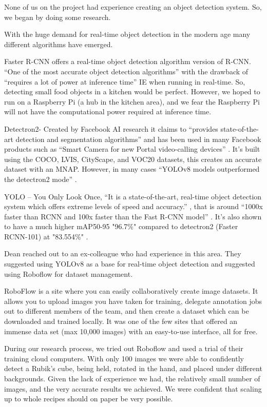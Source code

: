 \documentclass{article}
\begin{document}
None of us on the project had experience creating an object detection system. So, we began by doing some research.

With the huge demand for real-time object detection in the modern age many different algorithms have emerged.

Faster R-CNN offers a real-time object detection algorithm version of R-CNN. “One of the most accurate object detection algorithms” \cite{FasterRCNN} with the drawback of “requires a lot of power at inference time” IE when running in real-time. So, detecting small food objects in a kitchen would be perfect. However, we hoped to run on a Raspberry Pi (a hub in the kitchen area), and we fear the Raspberry Pi will not have the computational power required \cite{Fast-CNN-Rasberry-Pi} at inference time.

Detectron2- Created by Facebook AI research it claims to “provides state-of-the-art detection and segmentation algorithms” \cite{wu2019detectron2} and has been used in many Facebook products such as “Smart Camera for new Portal video-calling devices” \cite{metasmartcameras}. It’s built using the COCO, LVIS, CityScape, and VOC20 datasets, this creates an accurate dataset with an MNAP. However, in many cases “YOLOv8 models outperformed the detectron2 mode” \cite{ai5010005}.

YOLO – You Only Look Once, “It is a state-of-the-art, real-time object detection system which offers extreme levels of speed and accuracy.” \cite{rajeshwari2019object}, that is around “1000x faster than RCNN and 100x faster than the Fast R-CNN model” \cite{rajeshwari2019object}.  It's also shown to have a much higher mAP50-95 "96.7\%" compared to detectron2 (Faster RCNN-101) at "83.554\%" \cite{ai5010005}.

Dean reached out to an ex-colleague who had experience in this area. They suggested using YOLOv8 \cite{Jocher_Ultralytics_YOLO_2023} as a base for real-time object detection and suggested using Roboflow \cite{RoboFlow-Software} for dataset management.

RoboFlow \cite{RoboFlow-Software} is a site where you can easily collaboratively create image datasets. It allows you to upload images you have taken for training, delegate annotation jobs out to different members of the team, and then create a dataset which can be downloaded and trained locally. It was one of the few sites that offered an immense data set (max 10,000 images) with an easy-to-use interface, all for free.

During our research process, we tried out Roboflow and used a trial of their training cloud computers. With only 100 images we were able to confidently detect a Rubik's cube, being held, rotated in the hand, and placed under different backgrounds. Given the lack of experience we had, the relatively small number of images, and the very accurate results we achieved. We were confident that scaling up to whole recipes should on paper be very possible.
\end{document}
